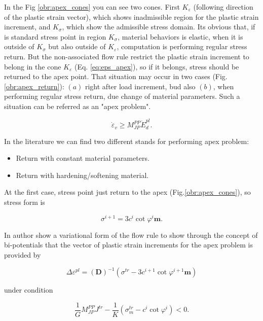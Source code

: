 In the Fig \ref{obr:apex_cones} you can see two cones. First $K_\varepsilon$ (following direction of the plastic strain vector), which shows inadmissible region for the plastic strain increment, and $K_\sigma$, which show the admissible stress domain. Its obvious that, if is standard stress point in region $K_\sigma$, material behaviors is elastic, when it is outside of $K_\sigma$ but also outside of $K_\varepsilon$, computation is performing regular stress return. But the non-associated flow rule restrict the plastic strain increment to belong in the cone $K_\varepsilon$ (Eq. \ref{eq:eps_apex}), so if it belongs, stress should be returned to the apex point. That situation may occur in two cases (Fig. \ref{obr:apex_return}): $(a)$ right after load increment, bud also $(b)$, when performing regular stress return, due change of material parameters. Such a situation can be referred as an "apex problem". 

\begin{equation}\label{eq:eps_apex}
	\dot{\varepsilon}_v \geq M_{JP}^{PP} \dot{E}_d^{pl}.
\end{equation}

In the literature we can find two different stands for performing apex problem:

\begin{itemize}
	\item Return with constant material parameters.
	\item Return with hardening/softening material.
\end{itemize}
At the first case, stress point just return to the apex (Fig.\ref{obr:apex_cones}), so stress form is

\begin{equation}\label{eq:sigPL}
	\sigma^{i+1} = 3c^{i} \cot \varphi^{i} \textbf{m}.
\end{equation}

In \cite{geofem} author show a variational form of the flow rule to show through the concept of bi-potentials that the vector of plastic strain increments for the apex problem is provided by

\begin{equation}\label{eq:epsPL}
	\Delta\varepsilon^{pl} = (\textbf{D})^{-1}( \sigma^{tr} - 3 c^{i+1} \cot \varphi^{i+1} \textbf{m} )
\end{equation}

under condition



\begin{equation}\label{eq:flow_condition}
\dfrac{1}{G} M_{JP}^{PP} J^{tr} - \dfrac{1}{K} (\sigma_m^{tr} - c^i \cot \varphi^i) < 0.
\end{equation}

